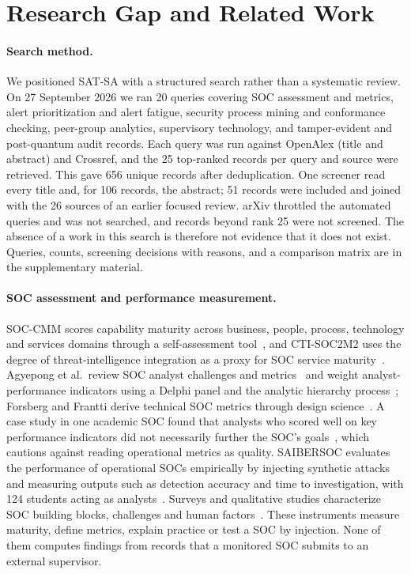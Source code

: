 \section{Research Gap and Related Work}
\label{sec:related}

\paragraph{Search method.}
We positioned SAT-SA with a structured search rather than a systematic review. On
27 September 2026 we ran 20 queries covering SOC assessment and metrics, alert
prioritization and alert fatigue, security process mining and conformance checking,
peer-group analytics, supervisory technology, and tamper-evident and post-quantum
audit records. Each query was run against OpenAlex (title and abstract) and Crossref,
and the 25 top-ranked records per query and source were retrieved. This gave 656
unique records after deduplication. One screener read every title and, for 106
records, the abstract; 51 records were included and joined with the 26 sources of an
earlier focused review. arXiv throttled the automated queries and was not searched,
and records beyond rank 25 were not screened. The absence of a work in this search
is therefore not evidence that it does not exist. Queries, counts, screening
decisions with reasons, and a comparison matrix are in the supplementary material.

\paragraph{SOC assessment and performance measurement.}
SOC-CMM scores capability maturity across business, people, process, technology and
services domains through a self-assessment tool~\cite{vanos2016soccmm}, and
CTI-SOC2M2 uses the degree of threat-intelligence integration as a proxy for SOC
service maturity~\cite{schlette2021ctisoc2m2}. Agyepong et al.\ review SOC analyst
challenges and metrics~\cite{agyepong2019review} and weight analyst-performance
indicators using a Delphi panel and the analytic hierarchy
process~\cite{agyepong2023analyst}; Forsberg and Frantti derive technical SOC
metrics through design science~\cite{forsberg2023metrics}. A case study in one
academic SOC found that analysts who scored well on key performance indicators did
not necessarily further the SOC's goals~\cite{morin2025mismatched}, which cautions
against reading operational metrics as quality. SAIBERSOC evaluates the performance
of operational SOCs empirically by injecting synthetic attacks and measuring outputs
such as detection accuracy and time to investigation, with 124 students acting as
analysts~\cite{rosso2020saibersoc}. Surveys and qualitative studies characterize SOC
building blocks, challenges and human
factors~\cite{vielberth2020soc,kokulu2019soc,sundaramurthy2015burnout,sundaramurthy2016contradictions}.
These instruments measure maturity, define metrics, explain practice or test a SOC
by injection. None of them computes findings from records that a monitored SOC
submits to an external supervisor.

